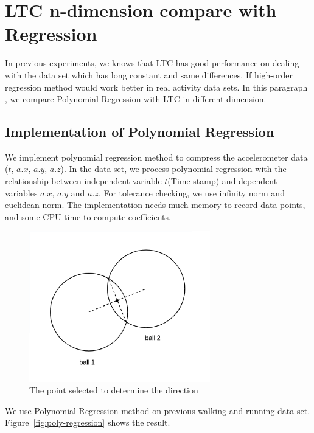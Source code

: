 \section{LTC n-dimension compare with Regression}
In previous experiments, we knows that LTC has good performance on dealing with
the data set which has long constant and same differences. If high-order
regression method would work better in real activity data sets. In this
paragraph , we compare Polynomial Regression with LTC in different dimension. 


\subsection{Implementation of Polynomial Regression}
We implement polynomial regression method to compress the accelerometer data
($t$, $a.x$, $a.y$, $a.z$). In the data-set, we process polynomial regression
with the relationship between independent variable $t$(Time-stamp) and dependent
variables $a.x$, $a.y$ and $a.z$. For tolerance checking, we use infinity norm
and euclidean norm. The implementation needs much memory to record data points,
and some CPU time to compute coefficients.

\begin{figure}
  \centering
\includegraphics[width=0.7\textwidth]{figures/point-in-chord.png}
\caption{The point selected to determine the direction}
\label{fig:compare_point}
\end{figure}

We use Polynomial Regression method on previous walking and running data set. Figure~\ref{fig:poly-regression} shows the result.

